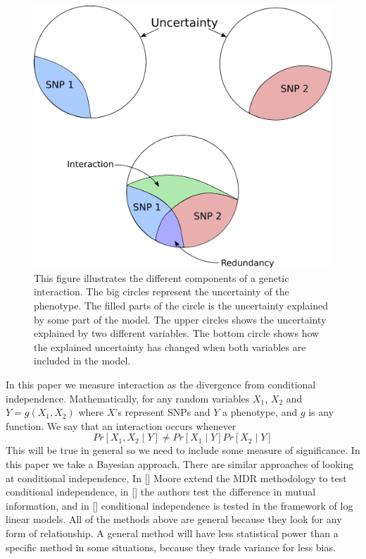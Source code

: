 \documentclass{bioinfo}
\begin{document}
\begin{figure}[!tpb]%
\centerline{\includegraphics[scale=0.3]{figures/interaction}}
\caption{This figure illustrates the different components of a genetic interaction. The big circles represent the uncertainty of the phenotype. The filled parts of the circle is the uncertainty explained by some part of the model. The upper circles shows the uncertainty explained by two different variables. The bottom circle shows how the explained uncertainty has changed when both variables are included in the model.}\label{fig:01}
\end{figure}

In this paper we measure interaction as the divergence from conditional independence. Mathematically, for any random variables $X_1$, $X_2$ and $Y = g(X_1, X_2)$ where $X$'s represent SNPs and $Y$ a phenotype, and $g$ is any function. We say that an interaction occurs whenever
$$ Pr[ X_1, X_2 \mid Y ] \neq Pr[ X_1 \mid Y ] Pr[ X_2 \mid Y ] $$
This will be true in general so we need to include some measure of significance. In this paper we take a Bayesian approach. There are similar approaches of looking at conditional independence, In [] Moore extend the MDR methodology to test conditional independence, in [] the authors test the difference in mutual information, and in [] conditional independence is tested in the framework of log linear models. All of the methods above are general because they look for any form of relationship. A general method will have less statistical power than a specific method in some situations, because they trade variance for less bias.
\end{document}
